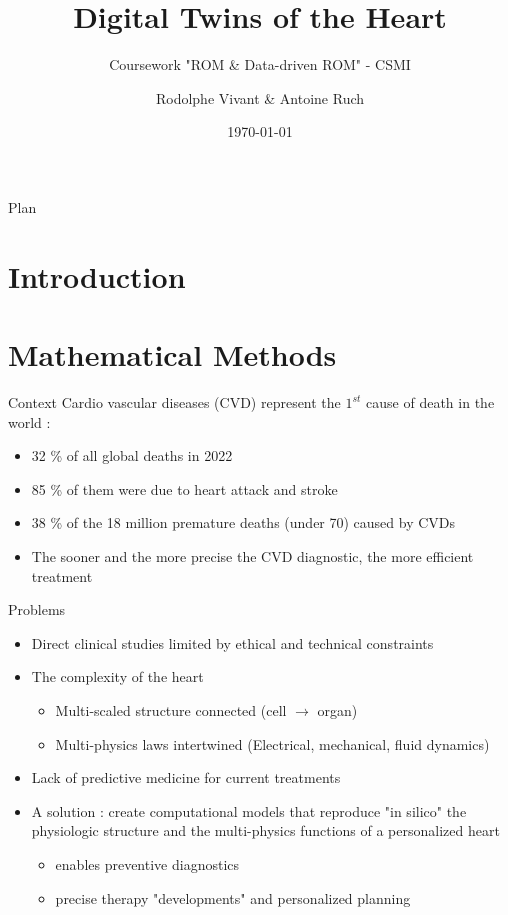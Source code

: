 \documentclass{beamer}
\title{Digital Twins of the Heart}
\subtitle{Coursework "ROM \& Data-driven ROM" - CSMI}
\author{Rodolphe Vivant \& Antoine Ruch}
\institute{UFR of Mathematics and Informatics}
\date{\today}
\begin{document}
\begin{frame}
  \titlepage
\end{frame}

\begin{frame}{Plan}
  \tableofcontents
\end{frame}

\section{Introduction}

\section{Mathematical Methods}
\begin{frame}{Context \cite{who2025cvd}}
  Cardio vascular diseases (CVD) represent the $1^{st}$ cause of death in the world \cite{who2025cvd} :
  \begin{itemize}
    \item 32 \% of all global deaths in 2022
    \item 85 \% of them were due to heart attack and stroke
    \item 38 \% of the 18 million premature deaths (under 70) caused by CVDs
    \item The sooner and the more precise the CVD diagnostic, the more efficient treatment 
  \end{itemize}
\end{frame}

\begin{frame}{Problems \cite{gerach2021electro}}
    \begin{itemize}
        \item Direct clinical studies limited by ethical and technical constraints
        \item The complexity of the heart 
        \begin{itemize}
            \item Multi-scaled structure connected (cell $\rightarrow$ organ)
            \item Multi-physics laws intertwined (Electrical, mechanical, fluid dynamics)
        \end{itemize}
        \item Lack of predictive medicine for current treatments
        \item A solution : create computational models that reproduce "in silico" the physiologic structure and the multi-physics functions of a personalized heart
        \begin{itemize}
            \item enables preventive diagnostics
            \item precise therapy "developments" and personalized planning 
        \end{itemize}  
    \end{itemize}
\end{frame}
\end{document}
